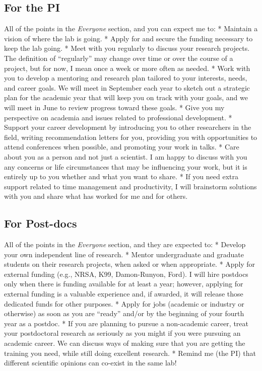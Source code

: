 \documentclass[
]{book}
\begin{document}
\hypertarget{for-the-pi}{%
\subsection{For the PI}\label{for-the-pi}}

All of the points in the \emph{Everyone} section, and you can expect me to:
* Maintain a vision of where the lab is going.
* Apply for and secure the funding necessary to keep the lab going.
* Meet with you regularly to discuss your research projects. The definition of ``regularly'' may change over time or over the course of a project, but for now, I mean once a week or more often as needed.
* Work with you to develop a mentoring and research plan tailored to your interests, needs, and career goals. We will meet in September each year to sketch out a strategic plan for the academic year that will keep you on track with your goals, and we will meet in June to review progress toward these goals.
* Give you my perspective on academia and issues related to professional development.
* Support your career development by introducing you to other researchers in the field, writing recommendation letters for you, providing you with opportunities to attend conferences when possible, and promoting your work in talks.
* Care about you as a person and not just a scientist. I am happy to discuss with you any concerns or life circumstances that may be influencing your work, but it is entirely up to you whether and what you want to share.
* If you need extra support related to time management and productivity, I will brainstorm solutions with you and share what has worked for me and for others.

\hypertarget{for-post-docs}{%
\subsection{For Post-docs}\label{for-post-docs}}

All of the points in the \emph{Everyone} section, and they are expected to:
* Develop your own independent line of research.
* Mentor undergraduate and graduate students on their research projects, when asked or when appropriate.
* Apply for external funding (e.g., NRSA, K99, Damon-Runyon, Ford). I will hire postdocs only when there is funding available for at least a year; however, applying for external funding is a valuable experience and, if awarded, it will release those dedicated funds for other purposes.
* Apply for jobs (academic or industry or otherwise) as soon as you are ``ready'' and/or by the beginning of your fourth year as a postdoc.
* If you are planning to pursue a non-academic career, treat your postdoctoral research as seriously as you might if you were pursuing an academic career. We can discuss ways of making sure that you are getting the training you need, while still doing excellent research.
* Remind me (the PI) that different scientific opinions can co-exist in the same lab!
\end{document}
